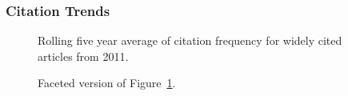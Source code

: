 \documentclass[
  10pt,
  letterpaper,
  DIV=11,
  numbers=noendperiod,
  twoside]{scrartcl}
\begin{document}
\subsubsection*{Citation Trends}\label{citation-trends-35}

\begin{figure}


\caption{\label{fig-citation-spaghetti-2011}Rolling five year average of
citation frequency for widely cited articles from 2011.}

\end{figure}%

\begin{figure}


\caption{\label{fig-citation-facet-2011}Faceted version of
Figure~\ref{fig-citation-spaghetti-2011}.}

\end{figure}%
\end{document}
